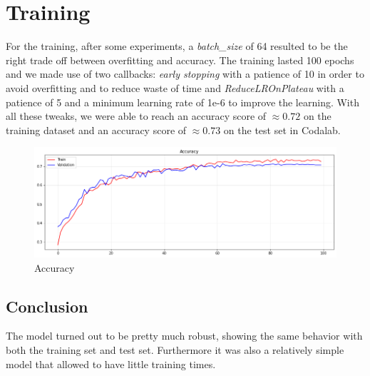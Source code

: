 \documentclass[11pt]{article}
\begin{document}
\section*{Training}
For the training, after some experiments, a \emph{batch\_size} of 64 resulted to be the right trade off between overfitting and accuracy. The training lasted 100 epochs and we made use of two callbacks: \emph{early stopping} with a patience of 10 in order to avoid overfitting and to reduce waste of time and \emph{ReduceLROnPlateau} with a patience of 5 and a minimum learning rate of 1e-6 to improve the learning.
With all these tweaks, we were able to reach an accuracy score of $\approx0.72$  on the training dataset and an accuracy score of $\approx0.73$ on the test set in Codalab.

\begin{figure}[H]
\center
	\includegraphics[width=\textwidth]{accuracy.png}
	\caption{Accuracy}
\end{figure}

\subsection*{Conclusion}
The model turned out to be pretty much robust, showing the same behavior with both the training set and test set. Furthermore it was also a relatively simple model that allowed to have little training times.
\end{document}
